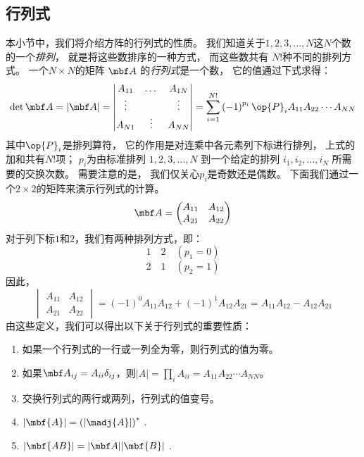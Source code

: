 \subsection{行列式}
\label{sec:1.1.3}
本小节中，我们将介绍方阵的行列式的性质。
我们知道关于$1, 2, 3, \dots, N$这$N$个数的一个\emph{排列}，
就是将这些数排序的一种方式，
而这些数共有 $N!$种不同的排列方式。
一个$N\times N$的矩阵 $\mbf A$ 的\emph{行列式}是一个数，
它的值通过下式求得：
\begin{equation}
 \det{\mbf A} = \vert {\mbf A} \vert = \begin{vmatrix}
     A_{11} &\dots &A_{1N} \\ \vdots & &\vdots \\ A_{N1} &\vdots &A_{NN} 
 \end{vmatrix} = \sum_{i=1}^{N!} \left(-1\right)^{p_i}\op{P}_iA_{11}A_{22}\cdots A_{NN}
 \label{eq:1.38}
\end{equation}
其中$\op{P}_i$是排列算符，
它的作用是对连乘中各元素列下标进行排列，
上式的加和共有$N!$项；
$p_i$为由标准排列 $1, 2, 3, \dots, N$ 到一个给定的排列 $i_1, i_2, \dots, i_N$ 所需要的交换次数。
需要注意的是，
我们仅关心$p_i$是奇数还是偶数。
下面我们通过一个$2 \times 2$的矩阵来演示行列式的计算。
\[{\mbf A} = \begin{pmatrix}
 A_{11} & A_{12} \\ A_{21} & A_{22}
\end{pmatrix}\]
对于列下标$1$和$2$，我们有两种排列方式，即：
\[
1 \quad 2 \quad \left(p_1 = 0\right)\]\[
2 \quad 1 \quad \left(p_2 = 1\right)\]
因此，
\begin{equation}
 \begin{vmatrix}
     A_{11} & A_{12} \\ A_{21} &A_{22}
 \end{vmatrix} = \left(-1\right)^0 A_{11}A_{12} + \left(-1\right)^1 A_{12}A_{21} = A_{11}A_{12} - A_{12}A_{21}
 \label{eq:1.39}
\end{equation}
由这些定义，我们可以得出以下关于行列式的重要性质：
\begin{enumerate}
 \item 如果一个行列式的一行或一列全为零，则行列式的值为零。
 \item 如果${\mbf A}_{ij} = A_{ii}\delta_{ij}$，则$\vert A\vert = \prod_i A_{ii} = A_{11}A_{22}\cdots A_{NN}$。
 \item 交换行列式的两行或两列，行列式的值变号。
 \item $\vert \mbf{A} \vert = \left(\vert\madj{A}\vert\right)^\ast$ .
 \item $\vert {\mbf{AB}}\vert = \vert{\mbf A}\vert\vert\mbf{B}\vert$ .
\end{enumerate}

